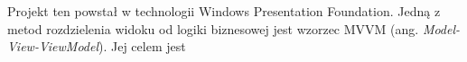 
Projekt ten powstał w technologii Windows Presentation Foundation. 
Jedną z metod rozdzielenia widoku od logiki biznesowej jest wzorzec MVVM (ang. \textit{Model-View-ViewModel}). Jej celem jest